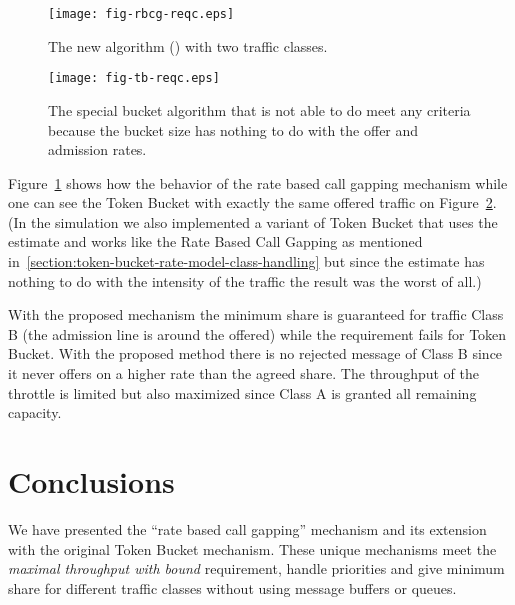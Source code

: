 \documentclass[conference]{IEEEtran}
\newcommand{\comment}[1]{}
\begin{document}
\begin{figure}[h]
\begin{center}
\texttt{[image: fig-rbcg-reqc.eps]}
\end{center}
\caption{The new algorithm () with two traffic
classes.}\label{fig:rbcg-meets-reqc}
\end{figure}

\begin{figure}[h]
\begin{center}
\texttt{[image: fig-tb-reqc.eps]}
\end{center}
\caption{The special bucket algorithm that is not able to do meet
any criteria because the bucket size has nothing to do with the
offer and admission rates.}\label{fig:tb-not-meets-reqc}
\end{figure}

Figure~\ref{fig:rbcg-meets-reqc} shows how the behavior of the rate
based call gapping mechanism while one can see the Token Bucket with
exactly the same offered traffic on
Figure~\ref{fig:tb-not-meets-reqc}. (In the simulation we also
implemented a variant of Token Bucket that uses the  estimate
and works like the Rate Based Call Gapping as mentioned
in~\ref{section:token-bucket-rate-model-class-handling} but since
the  estimate has nothing to do with the intensity of the
traffic the result was the worst of all.)

With the proposed mechanism the minimum share is guaranteed for
traffic Class B (the admission line is around the offered) while the
requirement fails for Token Bucket. With the proposed method there
is no rejected message of Class B since it never offers on a higher
rate than the agreed share. The throughput of the throttle is
limited but also maximized since Class A is granted all remaining
capacity.

\comment{
\subsection{Smoothness}
In this section we show how the different settings of parameter 
(parameters ) affects the smoothness of the figures. As it was
already discussed the rate estimators are asymptotically unbiased as
 meaning that large  values makes the rate estimation
better and robust against variance. On the other hand small 
values have the benefit of reacting more intensively for traffic
rate changes.}

\section{Conclusions}
We have presented the ``rate based call gapping'' mechanism and its
extension with the original Token Bucket mechanism. These unique
mechanisms meet the \textit{maximal throughput with bound}
requirement, handle priorities and give minimum share for different
traffic classes without using message buffers or queues.
\end{document}

